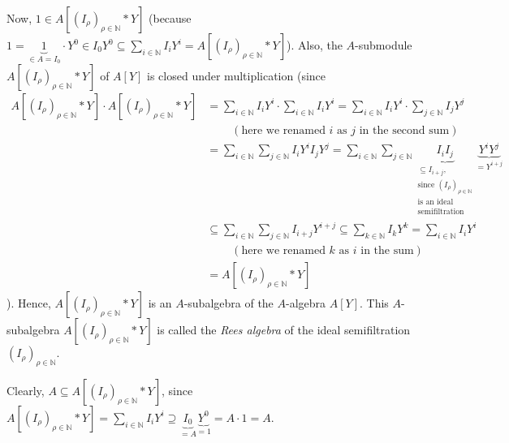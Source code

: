 \documentclass[12pt,final,notitlepage,onecolumn]{article}%
\begin{document}
Now, $1\in A\left[  \left(  I_{\rho}\right)  _{\rho\in\mathbb{N}}\ast
Y\right]  $ (because $1=\underbrace{1}_{\in A=I_{0}}\cdot Y^{0}\in I_{0}%
Y^{0}\subseteq\sum\limits_{i\in\mathbb{N}}I_{i}Y^{i}=A\left[  \left(  I_{\rho
}\right)  _{\rho\in\mathbb{N}}\ast Y\right]  $). Also, the $A$-submodule
$A\left[  \left(  I_{\rho}\right)  _{\rho\in\mathbb{N}}\ast Y\right]  $ of
$A\left[  Y\right]  $ is closed under multiplication (since%
\begin{align*}
A\left[  \left(  I_{\rho}\right)  _{\rho\in\mathbb{N}}\ast Y\right]  \cdot
A\left[  \left(  I_{\rho}\right)  _{\rho\in\mathbb{N}}\ast Y\right]   &
=\sum\limits_{i\in\mathbb{N}}I_{i}Y^{i}\cdot\sum\limits_{i\in\mathbb{N}}%
I_{i}Y^{i}=\sum\limits_{i\in\mathbb{N}}I_{i}Y^{i}\cdot\sum\limits_{j\in
\mathbb{N}}I_{j}Y^{j}\\
&  \ \ \ \ \ \ \ \ \ \ \left(  \text{here we renamed }i\text{ as }j\text{ in
the second sum}\right) \\
&  =\sum\limits_{i\in\mathbb{N}}\sum\limits_{j\in\mathbb{N}}I_{i}Y^{i}%
I_{j}Y^{j}=\sum\limits_{i\in\mathbb{N}}\sum\limits_{j\in\mathbb{N}}%
\underbrace{I_{i}I_{j}}_{\substack{\subseteq I_{i+j},\\\text{since }\left(
I_{\rho}\right)  _{\rho\in\mathbb{N}}\\\text{is an ideal}%
\\\text{semifiltration}}}\underbrace{Y^{i}Y^{j}}_{=Y^{i+j}}\\
&  \subseteq\sum\limits_{i\in\mathbb{N}}\sum\limits_{j\in\mathbb{N}}%
I_{i+j}Y^{i+j}\subseteq\sum_{k\in\mathbb{N}}I_{k}Y^{k}=\sum\limits_{i\in
\mathbb{N}}I_{i}Y^{i}\\
&  \ \ \ \ \ \ \ \ \ \ \left(  \text{here we renamed }k\text{ as }i\text{ in
the sum}\right) \\
&  =A\left[  \left(  I_{\rho}\right)  _{\rho\in\mathbb{N}}\ast Y\right]
\end{align*}
). Hence, $A\left[  \left(  I_{\rho}\right)  _{\rho\in\mathbb{N}}\ast
Y\right]  $ is an $A$-subalgebra of the $A$-algebra $A\left[  Y\right]  $.
This $A$-subalgebra $A\left[  \left(  I_{\rho}\right)  _{\rho\in\mathbb{N}%
}\ast Y\right]  $ is called the \textit{Rees algebra} of the ideal
semifiltration $\left(  I_{\rho}\right)  _{\rho\in\mathbb{N}}$.

Clearly, $A\subseteq A\left[  \left(  I_{\rho}\right)  _{\rho\in\mathbb{N}%
}\ast Y\right]  $, since $A\left[  \left(  I_{\rho}\right)  _{\rho
\in\mathbb{N}}\ast Y\right]  =\sum\limits_{i\in\mathbb{N}}I_{i}Y^{i}%
\supseteq\underbrace{I_{0}}_{=A}\underbrace{Y^{0}}_{=1}=A\cdot1=A$.
\end{document}
